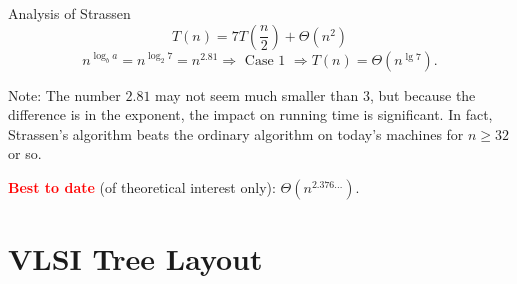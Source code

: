 \documentclass{beamer}
\newcommand{\toRight}[1]{
    \begin{FlushRight}
        {\small #1}
    \end{FlushRight}
}
\begin{document}
\begin{frame}{Analysis of Strassen}
    $$
        T(n) = 7T\left(\frac{n}{2}\right) + \Theta(n^2)
    $$
    \pause
    $$
        n^{\log_b a} = n^{\log_2 7} = n^{2.81} \Longrightarrow \text{ Case 1 } \Longrightarrow T(n) = \Theta(n^{\lg 7}) \text{.}
    $$
    \pause
    \begin{exampleblock}{Note:}
        The number $2.81$ may not seem much smaller than $3$, but because the difference is in the exponent, the impact on running time is significant. In fact, Strassen's algorithm beats the ordinary algorithm on today’s machines for $n \geq 32$ or so.
    \end{exampleblock}
    \pause
    \toRight{\textcolor{red}{\textbf{Best to date}} (of theoretical interest only): $\Theta(n^{2.376 \ldots})$.}
\end{frame}

\section{VLSI Tree Layout}
\end{document}

